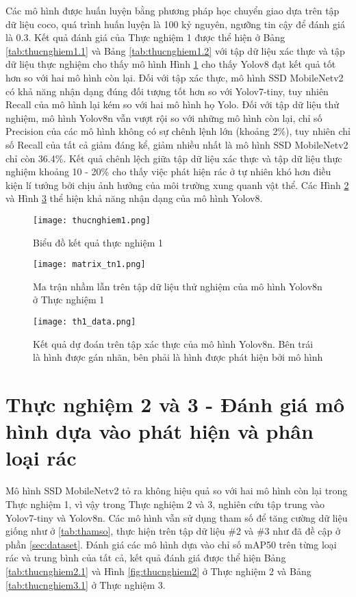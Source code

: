 \documentclass[../the.tex]{subfiles}
\begin{document}
{\fontsize{13}{12} \selectfont
Các mô hình được huấn luyện bằng phương pháp học chuyển giao dựa trên tập dữ liệu coco, quá trình huấn luyện là 100 kỷ nguyên, ngưỡng tin cậy để đánh giá là 0.3.
Kết quả đánh giá của Thực nghiệm 1 được thể hiện ở Bảng \ref{tab:thucnghiem1.1}
và Bảng \ref{tab:thucnghiem1.2} với tập dữ liệu xác thực và tập dữ liệu thực nghiệm cho thấy mô hình
Hình \ref{fig:thucnghiem1} cho thấy Yolov8 đạt kết quả tốt hơn so với hai mô hình còn lại. Đối với tập xác thực, mô hình SSD MobileNetv2 có khả năng nhận dạng đúng đối tượng tốt hơn so với Yolov7-tiny, tuy nhiên Recall của mô hình lại kém so với hai mô hình họ Yolo.
Đối với tập dữ liệu thử nghiệm, mô hình Yolov8n vẫn vượt rội so với những mô hình còn lại, chỉ số Precision của các mô hình không có sự chênh lệnh lớn (khoảng 2\%), tuy nhiên chỉ số Recall của tất cả giảm đáng kể, giảm nhiều nhất là mô hình SSD MobileNetv2 chỉ còn 36.4\%.
Kết quả chênh lệch giữa tập dữ liệu xác thực và tập dữ liệu thực nghiệm khoảng 10 - 20\% cho thấy việc phát hiện rác ở tự nhiên khó hơn điều kiện lí tưởng bởi chịu ảnh hưởng của môi trường xung quanh vật thể.
Các Hình \ref{fig:thucnghiem1.2} và Hình \ref{fig:thucnghiem1.3} thể hiện khả năng nhận dạng của mô hình Yolov8.

}

\begin{figure}[H]
    \centering
    \texttt{[image: thucnghiem1.png]}
    \caption{Biểu đồ kết quả thực nghiệm 1}
    \label{fig:thucnghiem1}
\end{figure}

\begin{figure}[H]
    \centering
    \texttt{[image: matrix\_tn1.png]}
    \caption{Ma trận nhầm lẫn trên tập dữ liệu thử nghiệm của mô hình Yolov8n ở Thực nghiệm 1}
    \label{fig:thucnghiem1.2}
\end{figure}

\begin{figure}[H]
    \centering
    \texttt{[image: th1\_data.png]}
    \caption{Kết quả dự đoán trên tập xác thực của mô hình Yolov8n. Bên trái là hình được gán nhãn, bên phải là hình được phát hiện bởi mô hình}
    \label{fig:thucnghiem1.3}
\end{figure}

\section{Thực nghiệm 2 và 3 - Đánh giá mô hình dựa vào phát hiện và phân loại rác}
 {\fontsize{13}{12} \selectfont
  Mô hình SSD MobileNetv2 tỏ ra không hiệu quả so với hai mô hình còn lại trong Thực nghiệm 1, vì vậy trong Thực nghiệm 2 và 3, nghiên cứu tập trung vào Yolov7-tiny và Yolov8n. Các mô hình vẫn sử dụng tham số để tăng cường dữ liệu giống như ở \ref{tab:thamso}, thực hiện trên tập dữ liệu \#2 và \#3 như đã đề cập ở phần \ref{sec:dataset}.
  Đánh giá các mô hình dựa vào chỉ số mAP50 trên từng loại rác và trung bình của tất cả, kết quả đánh giá được thể hiện Bảng \ref{tab:thucnghiem2.1} và Hình \ref{fig:thucnghiem2} ở Thực nghiệm 2 và Bảng \ref{tab:thucnghiem3.1} ở Thực nghiệm 3.
 }
\end{document}
